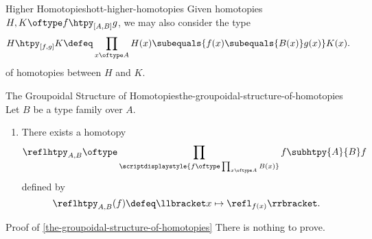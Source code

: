 \begin{remark}{Higher Homotopies}{hott-higher-homotopies}%
    Given homotopies $H,K\oftype f\htpy_{[A,B]}g$, we may also consider the type
    \[
        H\htpy_{[f,g]}K%
        \defeq%
        \prod_{x\oftype A}H(x)\subequals{f(x)\subequals{B(x)}g(x)}K(x).%
    \]%
    of homotopies between $H$ and $K$.
\end{remark}
\begin{proposition}{The Groupoidal Structure of Homotopies}{the-groupoidal-structure-of-homotopies}%
    Let $B$ be a type family over $A$.
    \begin{enumerate}
        \item\label{the-groupoidal-structure-of-homotopies-reflexivity}There exists a homotopy
            \[
                \reflhtpy_{A,B}%
                \oftype%
                \prod_{\scriptdisplaystyle{f\oftype\prod_{x\oftype A}B(x)}}f\subhtpy{A}{B}f%
            \]%
            defined by
            \[
                \reflhtpy_{A,B}(f)%
                \defeq%
                \llbracket x\mapsto\refl_{f(x)}\rrbracket.%
            \]%
    \end{enumerate}
\end{proposition}
\begin{Proof}{Proof of \cref{the-groupoidal-structure-of-homotopies}}%
    There is nothing to prove.
\end{Proof}
\begin{appendices}

\end{appendices}

